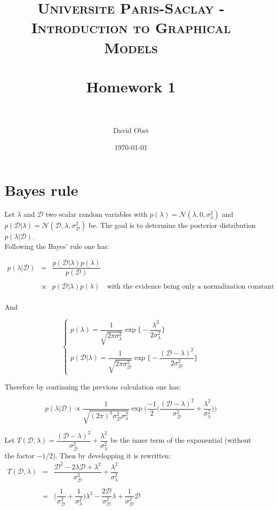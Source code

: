 \documentclass[paper=a4, fontsize=11pt]{scrartcl} %
\title{	
\normalfont \normalsize 
\textsc{Universite Paris-Saclay - Introduction to Graphical Models} \\ [25pt] %
\horrule{0.5pt} \\[0.4cm] %
\huge Homework 1 \\ %
\horrule{2pt} \\[0.5cm] %
}
\author{David Obst} %
\date{\normalsize\today} %
\numberwithin{equation}{section} %
\numberwithin{figure}{section} %
\numberwithin{table}{section} %
\newcommand{\D}{\mathcal{D}}
\newcommand{\N}{\mathcal{N}}
\renewcommand{\sl}{\sigma_\lambda}
\newcommand{\sd}{\sigma_\mathcal{D}}
\begin{document}
\maketitle

\section{Bayes rule}

Let $\lambda$ and $\D$ two scalar random variables with $p(\lambda) = \N(\lambda,0,\sl^2)$ and $p(\D | \lambda) = \N(\D,\lambda,\sd^2)$ be. The goal is to determine the posterior distribution $p(\lambda | \D)$. \\

Following the Bayes' rule one has:

$$\begin{array}{ccl}

p(\lambda | \D) & = & \dfrac{p(\D | \lambda) p(\lambda)}{p(\D)} \\
				\\
				& \propto & p(\D | \lambda) p(\lambda) \quad \text{with the evidence being only a normalization constant} \\

\end{array}$$

And 

$$\begin{cases}
	p(\lambda) = \dfrac{1}{\sqrt{2\pi \sl^2}} \exp \big\{ - \dfrac{\lambda^2}{2 \sl^2} \big\} \\
	p(\D | \lambda) = \dfrac{1}{\sqrt{2\pi \sd^2}} \exp \big\{ - \dfrac{(\D -\lambda)^2}{2 \sd^2} \big\} 
\end{cases}$$

Therefore by continuing the previous calculation one has:

\begin{equation}
p(\lambda | \D) \propto  \dfrac{1}{\sqrt{(2\pi)^2\sd^2 \sl^2}} \exp \Big( \dfrac{-1}{2} \big( \dfrac{(\D - \lambda)^2}{\sd^2} + \dfrac{\lambda^2}{\sl^2} \big) \Big)
\label{eq1}
\end{equation}


Let $T(\D,\lambda) = \dfrac{(\D - \lambda)^2}{\sd^2} + \dfrac{\lambda^2}{\sl^2} $ be the inner term of the exponential (without the factor $-1/2$). Then by developping it is rewritten: \\

$
\begin{array}{ccl}

T(\D,\lambda) & = & \dfrac{\D^2 - 2\lambda \D + \lambda^2}{\sd^2} + \dfrac{\lambda^2}{\sl^2} \\
\\
			  & = & \Big( \dfrac{1}{\sd^2} + \dfrac{1}{\sl^2} \Big) \lambda^2 - \dfrac{2 \D}{\sd^2} \lambda + \dfrac{1}{\sd^2} \D

\end{array}
$
\end{document}
